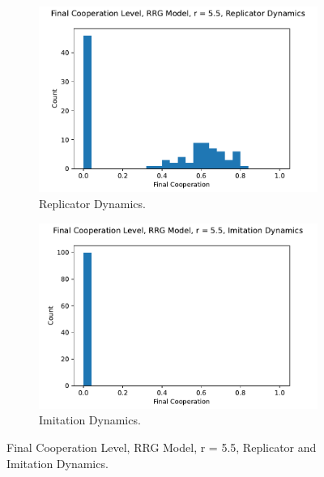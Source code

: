 \FloatBarrier 
\begin{figure}[!h]
  \begin{subfigure}[b]{0.45\textwidth}
    \includegraphics[width=1.1\textwidth]{images/Rep_coop_histo_RRG_55.pdf}
    \caption{Replicator Dynamics. }
    \label{Rep_RRG_55_coop_histo}
  \end{subfigure}
  \hfill
  \begin{subfigure}[b]{0.45\textwidth}
    \includegraphics[width=1.1\textwidth]{images/ID_coop_histo_RRG_55.pdf}
    \caption{Imitation Dynamics. }
    \label{ID_RRG_55_coop_histo}
  \end{subfigure}
  \caption{Final Cooperation Level, RRG Model, r = 5.5, Replicator and Imitation Dynamics. } \label{coop_histo_TAG}
\end{figure} 
\FloatBarrier




